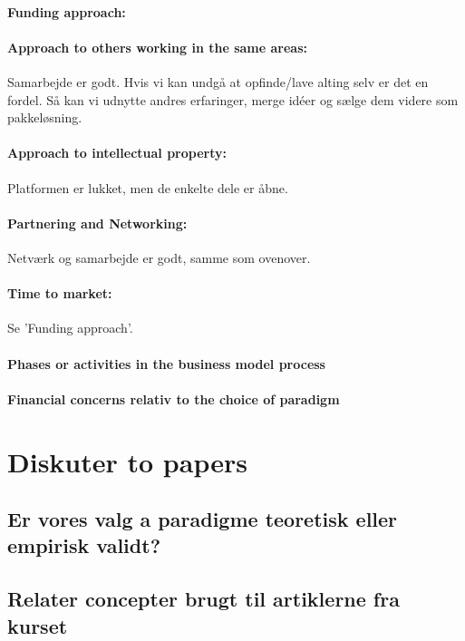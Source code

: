 \documentclass[a4paper]{article}
\begin{document}
\paragraph{Funding approach:} 

\paragraph{Approach to others working in the same areas:} Samarbejde er godt.
Hvis vi kan undgå at opfinde/lave alting selv er det en fordel.
Så kan vi udnytte andres erfaringer, merge idéer og sælge dem videre som pakkeløsning.

\paragraph{Approach to intellectual property:} Platformen er lukket, men de enkelte dele er åbne.

\paragraph{Partnering and Networking:} Netværk og samarbejde er godt, samme som ovenover.

\paragraph{Time to market:} Se 'Funding approach'.

\paragraph{Phases or activities in the business model process}
\paragraph{Financial concerns relativ to the choice of paradigm}

\section{Diskuter to papers}
\subsection{Er vores valg a paradigme teoretisk eller empirisk validt?}
\subsection{Relater concepter brugt til artiklerne fra kurset}

\printbibliography[heading=bibintoc]
\end{document}
